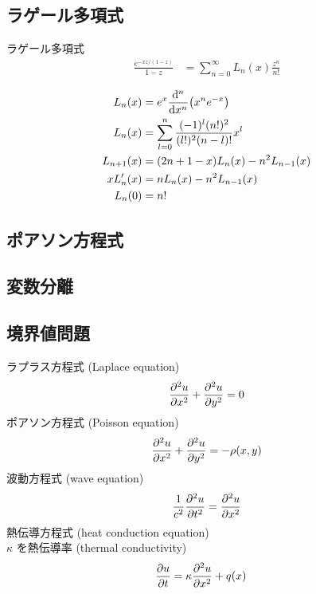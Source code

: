 \documentclass[uplatex,dvipdfmx,a4paper,11pt]{jlreq}
\theoremstyle{definition}
\begin{document}
\subsection{ラゲール多項式}
\begin{definition}
  ラゲール多項式
  \begin{align}
    \frac{e^{-xz/(1-z)}}{1-z} & = \sum_{n=0}^{\infty}L_n(x)\frac{z^n}{n!}
  \end{align}
\end{definition}
\begin{proposition}
  \begin{align}
    L_n(x)     & = e^x\dv[n]{x}(x^ne^{-x})                            \\
    L_n(x)     & = \sum_{l=0}^{n}\frac{(-1)^l(n!)^2}{(l!)^2(n-l)!}x^l \\
    L_{n+1}(x) & = (2n + 1 - x)L_n(x) - n^2L_{n-1}(x)                 \\
    xL_n'(x)   & = nL_n(x) - n^2L_{n-1}(x)                            \\
    L_n(0)     & = n!
  \end{align}
\end{proposition}

\subsection{ポアソン方程式}

\subsection{変数分離}

\subsection{境界値問題}
\begin{definition}
  ラプラス方程式 (Laplace equation)
  \begin{align}
    \pdv[2]{u}{x} + \pdv[2]{u}{y} = 0
  \end{align}
  ポアソン方程式 (Poisson equation)
  \begin{align}
    \pdv[2]{u}{x} + \pdv[2]{u}{y} = -\rho(x, y)
  \end{align}
  波動方程式 (wave equation)
  \begin{align}
    \frac{1}{c^2}\pdv[2]{u}{t} = \pdv[2]{u}{x}
  \end{align}
  熱伝導方程式 (heat conduction equation) \\
  $\kappa$ を熱伝導率 (thermal conductivity)
  \begin{align}
    \pdv{u}{t} & = \kappa\pdv[2]{u}{x} + q(x)
  \end{align}
\end{definition}
\end{document}
